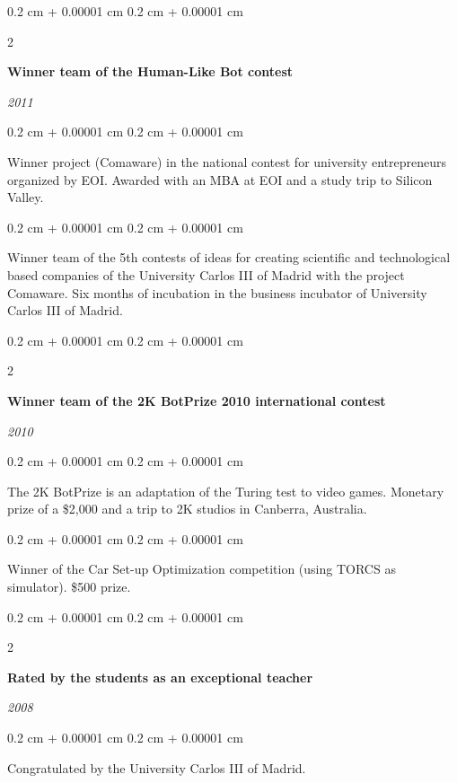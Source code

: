 \documentclass[10pt, letterpaper]{article}
\newenvironment{onecolentry}{
	\begin{adjustwidth}{
		0.2 cm + 0.00001 cm
	}{
		0.2 cm + 0.00001 cm
	}
	}{
	\end{adjustwidth}
} %
\newenvironment{twocolentry}[2][]{
	\onecolentry
	\def\secondColumn{#2}
	\setcolumnwidth{\fill, 5.5 cm}
	\begin{paracol}{2}
	}{
		\switchcolumn \raggedleft \secondColumn
	\end{paracol}
	\endonecolentry
} %
\begin{document}
	\begin{twocolentry}{
		\textit{2011}}
		\textbf{Winner team of the Human-Like Bot contest}
	\end{twocolentry}

	\vspace{0.10 cm}
	\begin{onecolentry}
		Winner project (Comaware) in the national contest for university entrepreneurs organized by EOI. Awarded with an MBA at EOI and a study trip to Silicon Valley.
	\end{onecolentry}

	\vspace{0.10 cm}
	\begin{onecolentry}
		Winner team of the 5th contests of ideas for creating scientific and technological based companies of the University Carlos III of Madrid with the project Comaware. Six months of incubation in the business incubator of University Carlos III of Madrid.
	\end{onecolentry}

	\vspace{0.2 cm}

	\begin{twocolentry}{
		\textit{2010}}
		\textbf{Winner team of the 2K BotPrize 2010 international contest}
	\end{twocolentry}

	\vspace{0.10 cm}
	\begin{onecolentry}
		The 2K BotPrize is an adaptation of the Turing test to video games. Monetary prize of a \$2,000 and a trip to 2K studios in Canberra, Australia.
	\end{onecolentry}

	\vspace{0.10 cm}
	\begin{onecolentry}
		Winner of the Car Set-up Optimization competition (using TORCS as simulator). \$500 prize.
	\end{onecolentry}

	\vspace{0.2 cm}

	\begin{twocolentry}{
		\textit{2008}}
		\textbf{Rated by the students as an exceptional teacher}
	\end{twocolentry}

	\vspace{0.10 cm}
	\begin{onecolentry}
		Congratulated by the University Carlos III of Madrid.
	\end{onecolentry}
\end{document}
